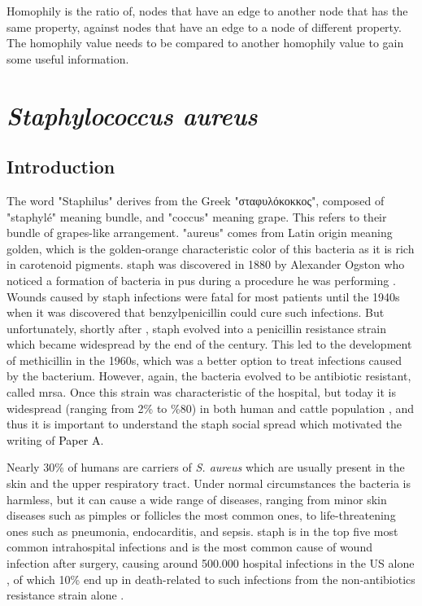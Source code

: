 Homophily is the ratio of, nodes that have an edge to another node that has the same property, against nodes that have an edge to a node of different property. The homophily value needs to be compared to another homophily value to gain some useful information.

\section{\textit{Staphylococcus aureus}}

\subsection{Introduction}

The word "Staphilus" derives from the Greek "σταφυλόκοκκος", composed of "staphylé" meaning bundle, and "coccus" meaning grape. This refers to their bundle of grapes-like arrangement. "aureus" comes from Latin origin meaning golden, which is the golden-orange characteristic color of this bacteria as it is rich in carotenoid pigments. \gls{staph} was discovered in 1880 by Alexander Ogston who noticed a formation of bacteria in pus during a procedure he was performing \cite{Lyell1989}. Wounds caused by \gls{staph} infections were fatal for most patients until the 1940s when it was discovered that benzylpenicillin could cure such infections. But unfortunately, shortly after \cite{Kirby1944}, \gls{staph} evolved into a penicillin resistance strain which became widespread by the end of the century. This led to the development of methicillin \cite{bookstaph} in the 1960s, which was a better option to treat infections caused by the bacterium. However, again, the bacteria evolved to be antibiotic resistant, called \gls{mrsa}. Once this strain was characteristic of the hospital, but today it is widespread (ranging from 2\% to \%80) in both human and cattle population \cite{Shoaib2023}, and thus it is important to understand the \gls{staph} social spread which motivated the writing of \colorbox{PaperColor}{\textcolor{black}{Paper A}}.




Nearly 30\% of humans are carriers of \textit{S. aureus} \cite{Kluytmans1997} which are usually present in the skin and the upper respiratory tract. Under normal circumstances the bacteria is harmless, but it can cause a wide range of diseases, ranging from minor skin diseases such as pimples or follicles the most common ones, to life-threatening ones such as pneumonia, endocarditis, and sepsis. \gls{staph} is in the top five most common intrahospital infections and is the most common cause of wound infection after surgery, causing around 500.000 hospital infections in the US alone \cite{Klein2007}, of which 10\% end up in death-related to such infections from the non-antibiotics resistance strain alone \cite{Aratani2021}.

